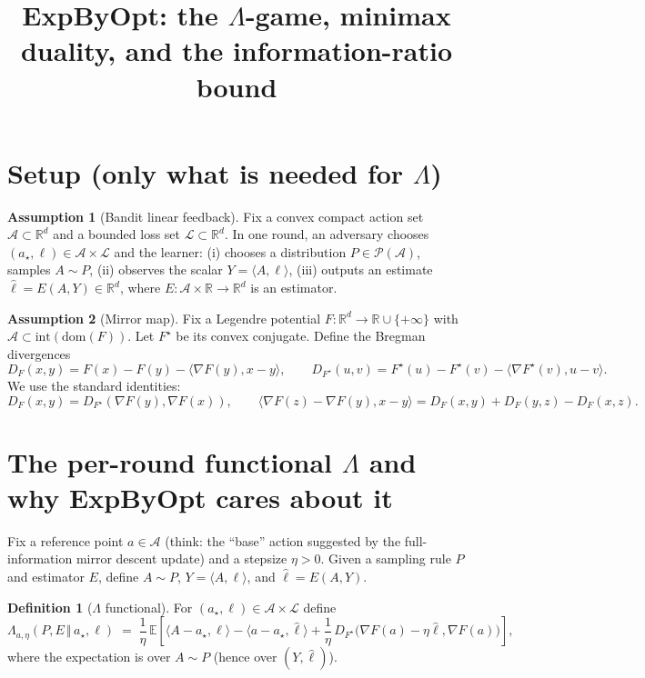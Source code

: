 \documentclass[11pt]{article}
\title{ExpByOpt: the $\Lambda$-game, minimax duality, and the information-ratio bound}
\date{}
\newcommand{\R}{\mathbb{R}}
\newcommand{\Rd}{\mathbb{R}^d}
\newcommand{\E}{\mathbb{E}}
\newcommand{\ip}[2]{\langle #1,#2\rangle}
\newcommand{\cA}{\mathcal{A}}
\newcommand{\cL}{\mathcal{L}}
\newcommand{\cP}{\mathcal{P}}
\theoremstyle{definition}
\newtheorem{definition}{Definition}
\newtheorem{assumption}{Assumption}
\theoremstyle{plain}
\theoremstyle{remark}
\begin{document}
\maketitle

\section{Setup (only what is needed for $\Lambda$)}

\begin{assumption}[Bandit linear feedback]
    Fix a convex compact action set $\cA\subset \Rd$ and a bounded loss set $\cL\subset \Rd$.
    In one round, an adversary chooses $(a_\star,\ell)\in \cA\times \cL$ and the learner:
    (i) chooses a distribution $P\in \cP(\cA)$, samples $A\sim P$,
    (ii) observes the scalar $Y=\ip{A}{\ell}$,
    (iii) outputs an estimate $\hat\ell = E(A,Y)\in\Rd$, where $E:\cA\times\R\to\Rd$ is an estimator.
\end{assumption}

\begin{assumption}[Mirror map]
    Fix a Legendre potential $F:\Rd\to\R\cup\{+\infty\}$ with $\cA\subset \mathrm{int}(\mathrm{dom}(F))$.
    Let $F^\star$ be its convex conjugate. Define the Bregman divergences
    \[
        D_F(x,y)=F(x)-F(y)-\ip{\nabla F(y)}{x-y},
        \qquad
        D_{F^\star}(u,v)=F^\star(u)-F^\star(v)-\ip{\nabla F^\star(v)}{u-v}.
    \]
    We use the standard identities:
    \[
        D_F(x,y)=D_{F^\star}(\nabla F(y),\nabla F(x)),\qquad
        \ip{\nabla F(z)-\nabla F(y)}{x-y}=D_F(x,y)+D_F(y,z)-D_F(x,z).
    \]
\end{assumption}

\section{The per-round functional $\Lambda$ and why ExpByOpt cares about it}

Fix a reference point $a\in\cA$ (think: the ``base'' action suggested by the full-information mirror descent update) and a stepsize $\eta>0$.
Given a sampling rule $P$ and estimator $E$, define $A\sim P$, $Y=\ip{A}{\ell}$, and $\hat\ell=E(A,Y)$.

\begin{definition}[$\Lambda$ functional]
    For $(a_\star,\ell)\in\cA\times\cL$ define
    \begin{equation}
        \label{eq:Lambda-point}
        \Lambda_{a,\eta}(P,E \,\Vert\, a_\star,\ell)
        \;=\;
        \frac{1}{\eta}\,
        \E\!\left[
        \ip{A-a_\star}{\ell}
        -\ip{a-a_\star}{\hat\ell}
        +\frac{1}{\eta}\,D_{F^\star}\!\big(\nabla F(a)-\eta \hat\ell,\nabla F(a)\big)
        \right],
    \end{equation}
    where the expectation is over $A\sim P$ (hence over $(Y,\hat\ell)$).
\end{definition}
\end{document}
